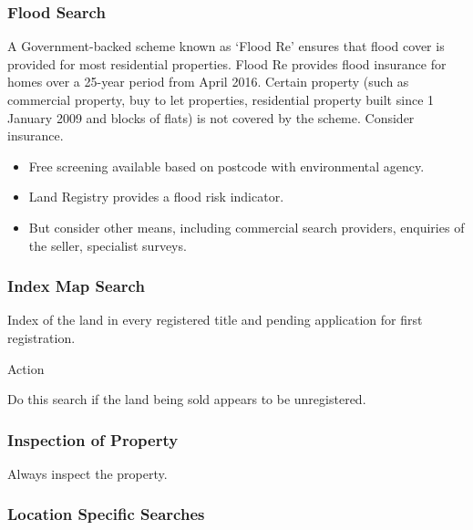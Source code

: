 \documentclass[
]{article}
\providecommand{\tightlist}{%
  \setlength{\itemsep}{0pt}\setlength{\parskip}{0pt}}
\newenvironment{env-a1c35d52-c355-4524-93c6-325e9133bd60}
{
    \savenotes\tcolorbox[blanker,breakable,left=5pt,borderline west={2pt}{-4pt}{aquamarine}]
}
{
    \endtcolorbox\spewnotes
}
\begin{document}
\hypertarget{flood-search}{%
\subsubsection{Flood Search}\label{flood-search}}

A Government-backed scheme known as `Flood Re' ensures that flood cover
is provided for most residential properties. Flood Re provides flood
insurance for homes over a 25-year period from April 2016. Certain
property (such as commercial property, buy to let properties,
residential property built since 1 January 2009 and blocks of flats) is
not covered by the scheme. Consider insurance.

\begin{itemize}
\tightlist
\item
  Free screening available based on postcode with environmental agency.
\item
  Land Registry provides a flood risk indicator.
\item
  But consider other means, including commercial search providers,
  enquiries of the seller, specialist surveys.
\end{itemize}

\hypertarget{index-map-search}{%
\subsubsection{Index Map Search}\label{index-map-search}}

Index of the land in every registered title and pending application for
first registration.

\begin{env-a1c35d52-c355-4524-93c6-325e9133bd60}

Action

Do this search if the land being sold appears to be unregistered.

\end{env-a1c35d52-c355-4524-93c6-325e9133bd60}

\hypertarget{inspection-of-property}{%
\subsubsection{Inspection of Property}\label{inspection-of-property}}

Always inspect the property.

\hypertarget{location-specific-searches}{%
\subsubsection{Location Specific
Searches}\label{location-specific-searches}}
\end{document}
